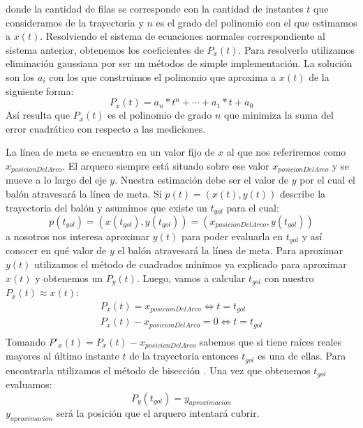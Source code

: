 donde la cantidad de filas se corresponde con la cantidad de instantes $t$ que consideramos de la trayectoria y $n$ es el grado del 
polinomio con el que estimamos a $x(t)$. Resolviendo el sistema de ecuaciones normales correspondiente al sistema anterior, obtenemos los coeficientes de $P_x(t)$. Para resolverlo utilizamos eliminación gaussiana por ser un métodos de simple
implementación. La solución son los $a_i$ con los que construimos el polinomio que aproxima a $x(t)$ de la siguiente forma:
\begin{displaymath}
P_x(t)=a_n*t^n + \cdots + a_1*t + a_0 
\end{displaymath}
Así resulta que $P_x(t)$ es el polinomio de grado $n$ que minimiza la suma del error cuadrático con respecto a las mediciones. 
\par
La línea de meta se encuentra en un valor fijo de $x$ al que nos referiremos como $x_{posicionDelArco}$. El arquero siempre está 
situado sobre ese valor $x_{posicionDelArco}$ y se mueve a lo largo del eje $y$. Nuestra estimación debe ser el valor de $y$ por el
cual el balón atravesará la línea de meta. Si $p(t) = (x(t), y(t))$ describe la trayectoria del balón y asumimos que existe un $t_{gol}$ para el 
cual:
\begin{displaymath}
  p(t_{gol}) = (x(t_{gol}), y(t_{gol})) = (x_{posicionDelArco}, y(t_{gol}))
\end{displaymath}
a nosotros nos interesa aproximar $y(t)$ para poder evaluarla en $t_{gol}$ y así conocer en qué valor de $y$ el balón atravesará la línea
de meta. Para aproximar $y(t)$ utilizamos el método de cuadrados mínimos ya explicado para aproximar $x(t)$ y obtenemos un $P_y(t)$. Luego,
vamos a calcular $t_{gol}$ con nuestro $P_x(t) \approx x(t)$:
\begin{align}
    P_x(t) = x_{posicionDelArco}  \Longleftrightarrow t = t_{gol}\\
    P_x(t) - x_{posicionDelArco} = 0 \Longleftrightarrow t = t_{gol}\\
\end{align}
Tomando $P'_x(t) = P_x(t) - x_{posicionDelArco}$ sabemos que si tiene raíces reales mayores al último instante $t$ de la trayectoria 
entonces $t_{gol}$ es una de ellas. Para encontrarla utilizamos el método de bisección \cite[]{BoostSite}. Una vez que obtenemos 
$t_{gol}$ evaluamos: 
\begin{displaymath}
  P_y(t_{gol}) = y_{aproximacion}
\end{displaymath}
$y_{aproximacion}$ será la posición que el arquero intentará cubrir.
\par

